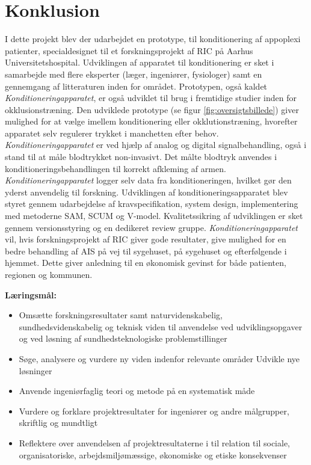 \chapter{Konklusion}
I dette projekt blev der udarbejdet en prototype, til konditionering af appoplexi patienter, specialdesignet til et forskningsprojekt af RIC på Aarhus Universitetshospital. Udviklingen af apparatet til konditionering er sket i samarbejde med flere eksperter (læger, ingeniører, fysiologer) samt en gennemgang af litteraturen inden for området. Prototypen, også kaldet \textit{Konditioneringapparatet}, er også udviklet til brug i fremtidige studier inden for okklusionstræning.
Den udviklede prototype (se figur \ref{fig:oversigtsbillede}) giver mulighed for at vælge imellem konditionering eller okklutionstræning, hvorefter apparatet selv regulerer trykket i manchetten efter behov. \textit{Konditioneringapparatet} er ved hjælp af analog og digital signalbehandling, også i stand til at måle blodtrykket non-invasivt. Det målte blodtryk anvendes i konditioneringsbehandlingen til korrekt afkleming af armen. \textit{Konditioneringapparatet} logger selv data fra konditioneringen, hvilket gør den yderst anvendelig til forskning. 
Udviklingen af konditioneringsapparatet blev styret gennem udarbejdelse af kravspecifikation, system design, implementering med metoderne SAM, SCUM og V-model. Kvalitetssikring af udviklingen er sket gennem versionsstyring og en dedikeret review gruppe.
\textit{Konditioneringapparatet} vil, hvis forskningsprojekt af RIC giver gode resultater, give mulighed for en bedre behandling af AIS på vej til sygehuset, på sygehuset og efterfølgende i hjemmet. Dette giver anledning til en økonomisk gevinst for både patienten, regionen og kommunen. 

\label{SidsteSide}

\textbf{Læringsmål:}
\begin{itemize}
	\item Omsætte forskningsresultater samt naturvidenskabelig, sundhedsvidenskabelig og teknisk viden til anvendelse ved udviklingsopgaver og ved løsning af sundhedsteknologiske problemstillinger
	\item Søge, analysere og vurdere ny viden indenfor relevante områder
	Udvikle nye løsninger
	\item Anvende ingeniørfaglig teori og metode på en systematisk måde
	\item Vurdere og forklare projektresultater for ingeniører og andre målgrupper, skriftlig og mundtligt
	
	\item Reflektere over anvendelsen af projektresultaterne i til relation til sociale, organisatoriske, arbejdsmiljømæssige, økonomiske og etiske konsekvenser
	
\end{itemize}




